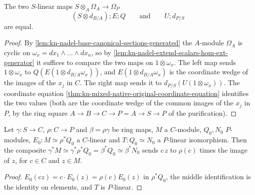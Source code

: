 \begin{theorem}
\label{thm:kn-nadel-mixed-native-square-commutes}
\leanok
The two $S$-linear maps $S\otimes_A\Omega_A\to\Omega_P$
\[
 (S\otimes d_{B/A});E;Q
 \qquad\text{and}\qquad
 U;d_{P/S}
\]
are equal.
\end{theorem}
\begin{proof}
By \cref{lem:kn-nadel-base-canonical-sections-generated} the $A$-module $\Omega_A$
is cyclic on $\omega_x=dx_1\wedge\dots\wedge dx_n$, so by
\cref{lem:kn-nadel-extend-scalars-hom-ext-generator} it suffices to compare the two
maps on $1\otimes\omega_x$. The left map sends $1\otimes\omega_x$ to
$Q(E(1\otimes d_{B/A}\omega_x))$, and $E(1\otimes d_{B/A}\omega_x)$ is the
coordinate wedge of the images of the $x_j$ in $C$. The right map sends it to
$d_{P/S}(U(1\otimes\omega_x))$. The coordinate equation
\cref{thm:kn-mixed-native-original-coordinate-equation} identifies the two values
(both are the coordinate wedge of the common images of the $x_j$ in $P$, by the
ring square $A\to B\to C\to P=A\to S\to P$ of the purification).
\end{proof}

\begin{lemma}
\label{lem:kn-nadel-outer-comparison-semilinear}
\leanok
Let $\gamma:S\to C$, $\rho:C\to P$ and $\beta=\rho\gamma$ be ring maps, $M$ a
$C$-module, $Q_0,N_0$ $P$-modules, $E_0:M\simeq\rho^*Q_0$ a $C$-linear and
$T:Q_0\simeq N_0$ a $P$-linear isomorphism. Then the composite
$\gamma^*M\simeq\gamma^*\rho^*Q_0=\beta^*Q_0\simeq\beta^*N_0$ sends $c\,z$ to
$\rho(c)$ times the image of $z$, for $c\in C$ and $z\in M$.
\end{lemma}
\begin{proof}
$E_0(cz)=c\cdot E_0(z)=\rho(c)E_0(z)$ in $\rho^*Q_0$, the middle identification is
the identity on elements, and $T$ is $P$-linear.
\end{proof}

